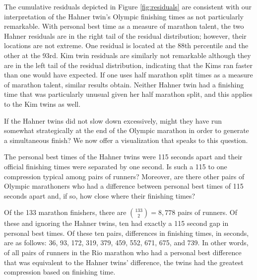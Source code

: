 \documentclass[12pt,titlepage]{article}
\begin{document}
The cumulative residuals depicted in Figure \ref{fig:residuals} are
consistent with our interpretation of the Hahner twin's Olympic
finishing times as not particularly remarkable.  With personal best
time as a measure of marathon talent, the two Hahner residuals are in
the right tail of the residual distribution; however, their locations
are not extreme.  One residual is located at the 88th percentile and
the other at the 93rd.  Kim twin residuals are similarly not
remarkable although they are in the left tail of the residual
distribution, indicating that the Kims ran faster than one would have
expected.  If one uses half marathon split times as a measure of
marathon talent, similar results obtain.  Neither Hahner twin had a
finishing time that was particularly unusual given her half marathon
split, and this applies to the Kim twins as well.

If the Hahner twins did not slow down excessively, might they have run
somewhat strategically at the end of the Olympic marathon in order to
generate a simultaneous finish?  We now offer a visualization that
speaks to this question.

The personal best times of the Hahner twins were 115 seconds apart and
their official finishing times were separated by one second.  Is such
a 115 to one compression typical among pairs of runners?  Moreover,
are there other pairs of Olympic marathoners who had a difference
between personal best times of 115 seconds apart and, if so, how close
where their finishing times?

Of the 133 marathon finishers, there are $\binom{133}{2} = 8,778$
pairs of runners.  Of these and ignoring the Hahner twins, ten had
exactly a 115 second gap in personal best times.  Of these ten pairs,
differences in finishing times, in seconds, are as follows: 36, 93, 172,
319, 379, 459, 552, 671, 675, and 739.  In other words, of all pairs
of runners in the Rio marathon who had a personal best difference that
was equivalent to the Hahner twins' difference, the twins had the
greatest compression based on finishing time.

\end{document}
